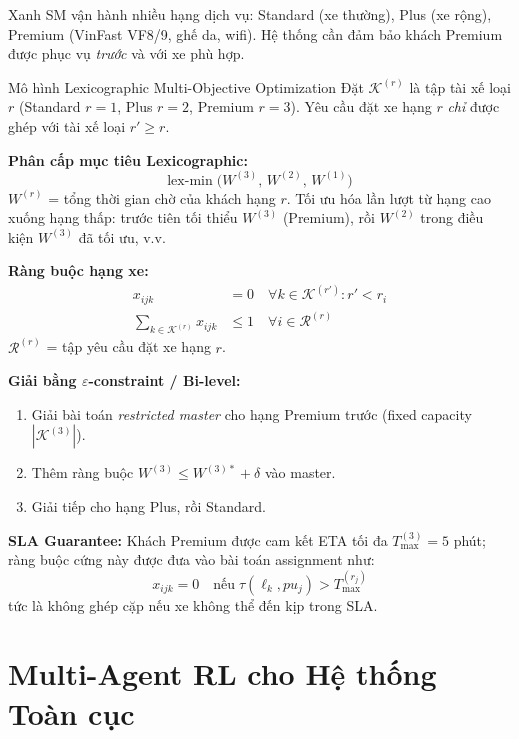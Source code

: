 \documentclass[12pt,a4paper]{article}
\begin{document}
Xanh SM vận hành nhiều hạng dịch vụ: Standard (xe thường), Plus (xe rộng),
Premium (VinFast VF8/9, ghế da, wifi). Hệ thống cần đảm bảo khách Premium
được phục vụ \emph{trước} và với xe phù hợp.

\begin{ridebox}{Mô hình Lexicographic Multi-Objective Optimization}
Đặt $\mathcal{K}^{(r)}$ là tập tài xế loại $r$ (Standard $r=1$, Plus $r=2$,
Premium $r=3$). Yêu cầu đặt xe hạng $r$ \emph{chỉ} được ghép với tài xế
loại $r'\geq r$.

\textbf{Phân cấp mục tiêu Lexicographic:}
\begin{equation}
  \mathrm{lex\text{-}min}\;\bigl(W^{(3)},\, W^{(2)},\, W^{(1)}\bigr)
\end{equation}
$W^{(r)}$ = tổng thời gian chờ của khách hạng $r$. Tối ưu hóa lần lượt từ
hạng cao xuống hạng thấp: trước tiên tối thiểu $W^{(3)}$ (Premium), rồi
$W^{(2)}$ trong điều kiện $W^{(3)}$ đã tối ưu, v.v.

\textbf{Ràng buộc hạng xe:}
\begin{align}
  x_{ijk} &= 0 \quad\forall k\in\mathcal{K}^{(r')}: r' < r_i
    \tag{T1: Tier compatibility}\\
  \sum_{k\in\mathcal{K}^{(r)}} x_{ijk} &\leq 1
    \quad\forall i\in\mathcal{R}^{(r)}
    \tag{T2: Single assignment}
\end{align}
$\mathcal{R}^{(r)}$ = tập yêu cầu đặt xe hạng $r$.

\textbf{Giải bằng $\varepsilon$-constraint / Bi-level:}
\begin{enumerate}
  \item Giải bài toán \emph{restricted master} cho hạng Premium trước
    (fixed capacity $|\mathcal{K}^{(3)}|$).
  \item Thêm ràng buộc $W^{(3)}\leq W^{(3)*}+\delta$ vào master.
  \item Giải tiếp cho hạng Plus, rồi Standard.
\end{enumerate}
\end{ridebox}

\textbf{SLA Guarantee:} Khách Premium được cam kết ETA tối đa $T_{\max}^{(3)}=5$ phút;
ràng buộc cứng này được đưa vào bài toán assignment như:
\begin{equation}
  x_{ijk}=0 \quad\text{nếu}\; \hat{\tau}(\ell_k,pu_j) > T_{\max}^{(r_j)}
\end{equation}
tức là không ghép cặp nếu xe không thể đến kịp trong SLA.

\section{Multi-Agent RL cho Hệ thống Toàn cục}
\end{document}
